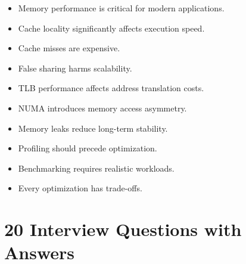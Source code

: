 \begin{itemize}
\item Memory performance is critical for modern applications.
\item Cache locality significantly affects execution speed.
\item Cache misses are expensive.
\item False sharing harms scalability.
\item TLB performance affects address translation costs.
\item NUMA introduces memory access asymmetry.
\item Memory leaks reduce long-term stability.
\item Profiling should precede optimization.
\item Benchmarking requires realistic workloads.
\item Every optimization has trade-offs.
\end{itemize}

\section{20 Interview Questions with Answers}


